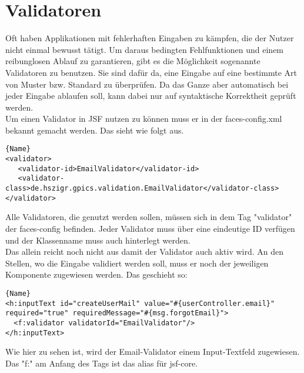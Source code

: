 \section{Validatoren}
\label{JumpValidatoren}
Oft haben Applikationen mit fehlerhaften Eingaben zu kämpfen, die der Nutzer nicht einmal bewusst tätigt. Um daraus bedingten Fehlfunktionen und einem reibunglosen Ablauf zu garantieren, gibt es die Möglichkeit sogenannte Validatoren zu benutzen.
Sie sind dafür da, eine Eingabe auf eine bestimmte Art von Muster bzw. Standard zu überprüfen. Da das Ganze aber automatisch bei jeder Eingabe ablaufen soll, kann dabei nur auf syntaktische Korrektheit geprüft werden. \\

Um einen Validator in JSF nutzen zu können muss er in der faces-config.xml bekannt gemacht werden. Das sieht wie folgt aus.
\begin{lstlisting}[caption=Einbinden eines Validators ind die faces-config.xml]{Name}
<validator>
   <validator-id>EmailValidator</validator-id>
   <validator-class>de.hszigr.gpics.validation.EmailValidator</validator-class>
</validator>
\end{lstlisting}
Alle Validatoren, die genutzt werden sollen, müssen sich in dem Tag "validator" der faces-config befinden. Jeder Validator muss über eine eindeutige ID verfügen und der Klassenname muss auch hinterlegt werden. \\
Das allein reicht noch nicht aus damit der Validator auch aktiv wird. An den Stellen, wo die Eingabe validiert werden soll, muss er noch der jeweiligen Komponente zugewiesen werden. Das geschieht so:
\begin{lstlisting}[caption=Zuweisung eines Validators einer Komponente]{Name}
<h:inputText id="createUserMail" value="#{userController.email}" required="true" requiredMessage="#{msg.forgotEmail}">
  <f:validator validatorId="EmailValidator"/>
</h:inputText>
\end{lstlisting}
Wie hier zu sehen ist, wird der Email-Validator einem Input-Textfeld zugewiesen. Das "f:" am Anfang des Tags ist das alias für jsf-core.


